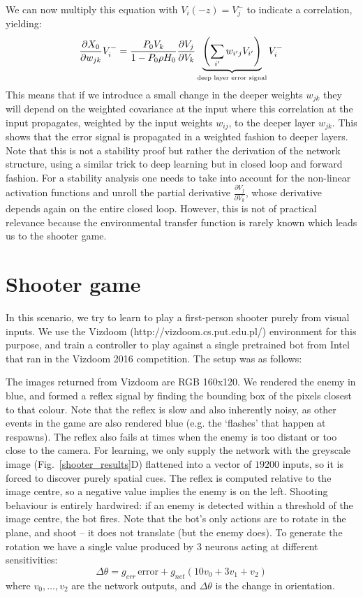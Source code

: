 \documentclass{article}
\begin{document}
  We can now multiply this equation with $V_i(-z)=V_j^-$ to indicate a correlation, yielding:
\begin{equation}
    \frac{\partial X_0}{\partial w_{jk}} V_i^- =   
    \frac{P_0 V_k}{1-P_0 \rho H_0}
    \frac{\partial V_j}{\partial V_k}
    \underbrace{\left( \sum_{i^\prime} w_{i^\prime j} V_{i^\prime} \right)}_\textrm{\tiny deep layer error signal} V_i^-
\end{equation}
This means that if we introduce a small change in the deeper weights
$w_{jk}$ they will depend on the weighted covariance at the input
where this correlation at the input propagates, weighted by the input
weights $w_{ij}$, to the deeper layer $w_{jk}$. This shows that the
error signal is propagated in a weighted fashion to deeper
layers. Note that this is not a stability proof but rather the
derivation of the network structure, using a similar trick to deep
learning but in closed loop and forward fashion. For a stability
analysis one needs to take into account for the non-linear activation
functions and unroll the partial derivative $\frac{\partial
  V_j}{\partial V_k}$, whose derivative depends again on the entire
closed loop. However, this is not of practical relevance because the
environmental transfer function is rarely known which leads us to
the shooter game.
    
\section{Shooter game}
In this scenario, we try to learn to play a first-person shooter
purely from visual inputs. We use the Vizdoom
(http://vizdoom.cs.put.edu.pl/) environment for this purpose, and
train a controller to play against a single pretrained bot from Intel
that ran in the Vizdoom 2016 competition. The setup was as follows:

The images returned from Vizdoom are RGB 160x120. We rendered the
enemy in blue, and formed a reflex signal by finding the bounding box
of the pixels closest to that colour. Note that the reflex is slow and
also inherently noisy, as other events in the game are also rendered
blue (e.g. the ‘flashes’ that happen at respawns). The reflex also
fails at times when the enemy is too distant or too close to the
camera. For learning, we only supply the network with the greyscale
image (Fig.~\ref{shooter_results}D) flattened into a vector of $19200$
inputs, so it is forced to discover purely spatial cues. The reflex is
computed relative to the image centre, so a negative value implies the
enemy is on the left. Shooting behaviour is entirely hardwired: if an
enemy is detected within a threshold of the image centre, the bot
fires. Note that the bot's only actions are to rotate in the plane,
and shoot -- it does not translate (but the enemy does). To generate
the rotation we have a single value produced by 3 neurons acting at
different sensitivities:
\begin{equation}
\Delta \theta = g_{err}\, \mathrm{error} + g_{net} \left( 10 v_0 + 3 v_1 + v_2 \right)
\end{equation}
where $v_0, \ldots, v_2$ are the network outputs, and $\Delta \theta$
is the change in orientation.
\end{document}
